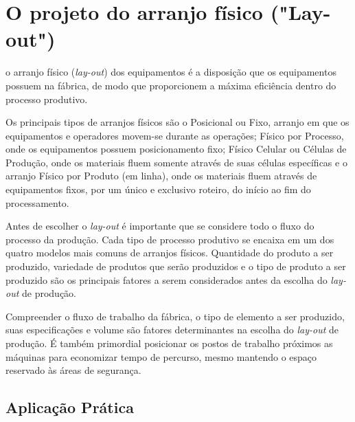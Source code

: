 \chapter{O projeto do arranjo físico ("Lay-out")}
\label{chap:projeto_do_arranjo}
o arranjo físico (\textit{lay-out}) dos equipamentos é a disposição que os equipamentos possuem na fábrica, de modo que proporcionem a máxima eficiência dentro do processo produtivo.

Os principais tipos de arranjos físicos são o Posicional ou Fixo, arranjo em que os equipamentos e operadores movem-se durante as operações; Físico por Processo, onde os equipamentos possuem posicionamento fixo; Físico Celular ou Células de Produção, onde os materiais fluem somente através de suas células específicas e o arranjo Físico por Produto (em linha), onde os materiais fluem através de equipamentos fixos, por um único e exclusivo roteiro, do início ao fim do processamento.

Antes de escolher o \textit{lay-out} é importante que se considere todo o fluxo do processo da produção. Cada tipo de processo produtivo se encaixa em um dos quatro modelos mais comuns de arranjos físicos. Quantidade do produto a ser produzido, variedade de produtos que serão produzidos e o tipo de produto a ser produzido são os principais fatores a serem considerados antes da escolha do \textit{lay-out} de produção.

Compreender o fluxo de trabalho da fábrica, o tipo de elemento a ser produzido, suas especificações e volume são fatores determinantes na escolha do \textit{lay-out} de produção. É também primordial posicionar os postos de trabalho próximos as máquinas para economizar tempo de percurso, mesmo mantendo o espaço reservado às áreas de segurança.

\section{Aplicação Prática}
\label{sec:projeto_do_arranjo_aplicacao}